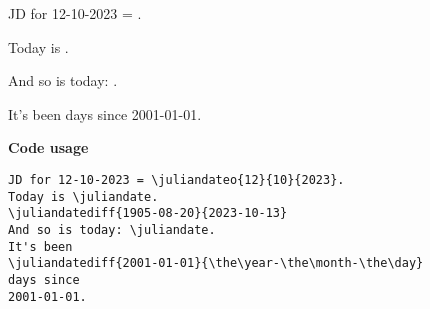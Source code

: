 \documentclass{article}
\begin{document}
JD for 12-10-2023 = .

Today is \juliandate.



And so is today: \juliandate.

It's been
days since
2001-01-01.

\bigskip\noindent
\textbf{Code usage}
\begin{verbatim}
JD for 12-10-2023 = \juliandateo{12}{10}{2023}.
Today is \juliandate.
\juliandatediff{1905-08-20}{2023-10-13}
And so is today: \juliandate.
It's been
\juliandatediff{2001-01-01}{\the\year-\the\month-\the\day}
days since
2001-01-01.
\end{verbatim}
\end{document}
